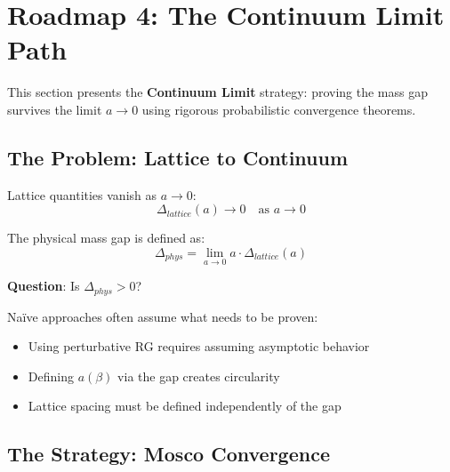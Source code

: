 \section{Roadmap 4: The Continuum Limit Path}
\label{sec:roadmap-continuum-limit}

This section presents the \textbf{Continuum Limit} strategy: proving the mass 
gap survives the limit $a \to 0$ using rigorous probabilistic convergence theorems.

\subsection{The Problem: Lattice to Continuum}

\begin{problem}
Lattice quantities vanish as $a \to 0$:
\begin{equation}
\Delta_{lattice}(a) \to 0 \quad \text{as } a \to 0
\end{equation}

The physical mass gap is defined as:
\begin{equation}
\Delta_{phys} = \lim_{a \to 0} a \cdot \Delta_{lattice}(a)
\end{equation}

\textbf{Question}: Is $\Delta_{phys} > 0$?
\end{problem}

\begin{danger}
Na\"ive approaches often assume what needs to be proven:
\begin{itemize}
\item Using perturbative RG requires assuming asymptotic behavior
\item Defining $a(\beta)$ via the gap creates circularity
\item Lattice spacing must be defined independently of the gap
\end{itemize}
\end{danger}

\subsection{The Strategy: Mosco Convergence}

